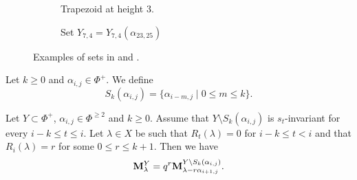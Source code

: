    \begin{figure}[H]
        \centering
        \begin{subfigure}[t]{0.3\textwidth}
        \caption{Trapezoid at height 3.}
        \label{fig: tpz T}
        \end{subfigure}
        \hspace{1cm}
        \begin{subfigure}[t]{0.5\textwidth}
        \caption{Set  $Y_{7,4}=Y_{7,4}(\alpha_{23,25})$}
        \label{fig: ejemplo y43}
        \end{subfigure}
        \caption{Examples of sets in  and . }
    \end{figure}







\begin{definition}\rm\label{def: SSS}
Let  $k\geq 0$ and $\alpha_{i,j} \in \Phi^+$. We define 
\begin{equation}
    S_k(\alpha_{i,j}) = \{   \alpha_{i-m,j}  \mid 0 \leq m \leq k     \}.
\end{equation}
\end{definition}




\begin{lemma}\rm\label{lem: second string lemma} 
Let   $Y \subset \Phi^{+}$, $\alpha_{i,j}\in \Phi^{\geq 2}$ and $k\geq 0$.
Assume that $Y \setminus S_{k}(\alpha_{i,j})$ is $s_t$-invariant for every $  i-k\leq  t \leq i$.
Let $\lambda \in X$ be such that $R_t(\lambda)=0$ for $i-k \leq t < i$ and that $R_i(\lambda)=r$ for some $0 \leq r \leq k+1$. Then we have
\begin{equation}
\mathbf{M}_{\lambda}^{Y} = q^{r}\mathbf{M}_{\lambda - r\alpha_{i+1,j}}^{Y\setminus S_{k}(\alpha_{i,j})}.
\end{equation}
\end{lemma}



